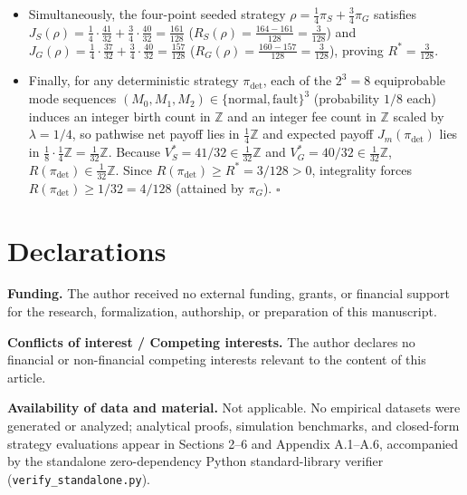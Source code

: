 \documentclass[11pt,a4paper]{article}
\begin{document}
\begin{itemize}
  after \((1,1)\). Thus \(V_w^* = \frac{5}{4}\), giving the universal
  minimax lower bound across \emph{all} real-randomized strategies:
  \[R^* \ge L(w) = \frac{3}{4}\cdot\frac{41}{32} + \frac{1}{4}\cdot\frac{40}{32} - \frac{5}{4} = \frac{123 + 40 - 160}{128} = \frac{3}{128}.\]
\item
  Simultaneously, the four-point seeded strategy
  \(\rho = \frac{1}{4}\pi_S + \frac{3}{4}\pi_G\) satisfies
  \(J_S(\rho) = \frac{1}{4}\cdot\frac{41}{32} + \frac{3}{4}\cdot\frac{40}{32} = \frac{161}{128}\)
  (\(R_S(\rho) = \frac{164 - 161}{128} = \frac{3}{128}\)) and
  \(J_G(\rho) = \frac{1}{4}\cdot\frac{37}{32} + \frac{3}{4}\cdot\frac{40}{32} = \frac{157}{128}\)
  (\(R_G(\rho) = \frac{160 - 157}{128} = \frac{3}{128}\)), proving
  \(R^* = \frac{3}{128}\).
\item
  Finally, for any deterministic strategy \(\pi_{\mathrm{det}}\), each
  of the \(2^3 = 8\) equiprobable mode sequences
  \((M_0, M_1, M_2) \in \{\mathrm{normal}, \mathrm{fault}\}^3\)
  (probability \(1/8\) each) induces an integer birth count in
  \(\mathbb{Z}\) and an integer fee count in \(\mathbb{Z}\) scaled by
  \(\lambda = 1/4\), so pathwise net payoff lies in
  \(\frac{1}{4}\mathbb{Z}\) and expected payoff
  \(J_m(\pi_{\mathrm{det}})\) lies in
  \(\frac{1}{8}\cdot\frac{1}{4}\mathbb{Z} = \frac{1}{32}\mathbb{Z}\).
  Because \(V_S^* = 41/32 \in \frac{1}{32}\mathbb{Z}\) and
  \(V_G^* = 40/32 \in \frac{1}{32}\mathbb{Z}\),
  \(R(\pi_{\mathrm{det}}) \in \frac{1}{32}\mathbb{Z}\). Since
  \(R(\pi_{\mathrm{det}}) \ge R^* = 3/128 > 0\), integrality forces
  \(R(\pi_{\mathrm{det}}) \ge 1/32 = 4/128\) (attained by \(\pi_G\)).
  \(\square\)
\end{itemize}

\section*{Declarations}\label{declarations}

\textbf{Funding.} The author received no external funding, grants, or
financial support for the research, formalization, authorship, or
preparation of this manuscript.

\textbf{Conflicts of interest / Competing interests.} The author
declares no financial or non-financial competing interests relevant to
the content of this article.

\textbf{Availability of data and material.} Not applicable. No empirical
datasets were generated or analyzed; analytical proofs, simulation
benchmarks, and closed-form strategy evaluations appear in Sections 2--6
and Appendix A.1--A.6, accompanied by the standalone zero-dependency
Python standard-library verifier (\texttt{verify\_standalone.py}).
\end{document}
